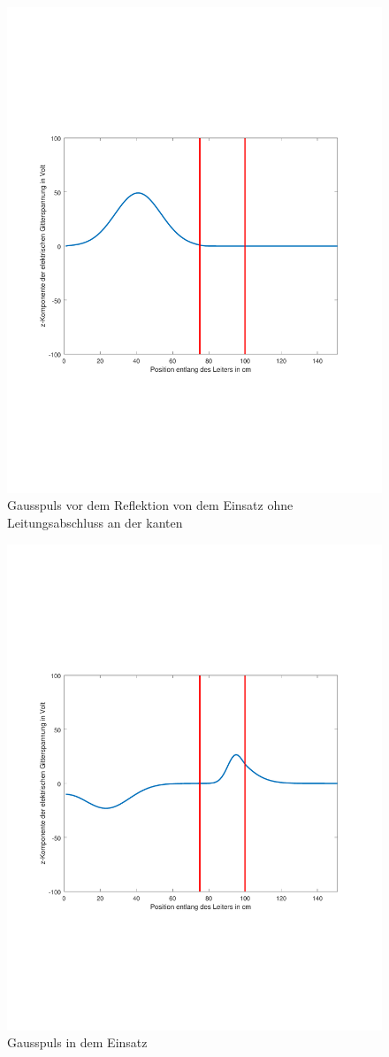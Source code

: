 \documentclass[Protokollheft.tex]{subfiles}
\begin{document}
\begin{figure}[ht]
	\centering
	\includegraphics[trim = 20mm 65mm 20mm 65mm, clip,width=0.7\linewidth]{untitledG1.pdf}
	\caption{Gausspuls vor dem Reflektion von dem Einsatz ohne Leitungsabschluss an der kanten}\label{fig:inh4}
\end{figure} 
\begin{figure}[ht]
	\centering
	\includegraphics[trim = 20mm 65mm 20mm 65mm, clip,width=0.7\linewidth]{untitledG2.pdf}
	\caption{Gausspuls in dem Einsatz}\label{fig:inh5}
\end{figure} 
\end{document}
